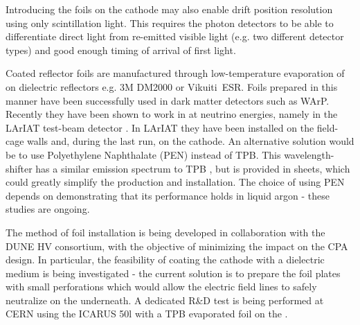 Introducing the foils on the cathode may also enable drift position resolution using only scintillation light. This requires the photon detectors to be able to differentiate direct  light from re-emitted visible light (e.g. two different  detector types) and good enough timing of arrival of first light.

Coated reflector foils are manufactured through low-temperature evaporation of  on dielectric reflectors e.g. 3M DM2000 or Vikuiti\texttrademark\  ESR. Foils prepared in this manner have been successfully used in dark matter detectors such as WArP\cite{Acciarri:2008kv}. Recently they have been shown to work in  at neutrino energies, namely  in the LArIAT test-beam detector \cite{Garcia-Gamez:2017cmu}. In LArIAT they have been installed on the field-cage walls and, during the last run, on the cathode. An alternative solution would be to use Polyethylene Naphthalate (PEN) instead of TPB. This wavelength-shifter has a similar emission spectrum to TPB \cite{Kuzniak:2018dcf}, but is provided in sheets, which could greatly simplify the production and installation. The choice of using PEN depends on demonstrating that its performance holds in liquid argon - these studies are ongoing. 


The method of foil installation is being developed in collaboration with the DUNE HV consortium, with the objective of minimizing the impact on the CPA design. 
In particular, the feasibility of coating the cathode with a dielectric medium is being investigated - the current solution is to prepare the foil plates with small perforations which would allow the electric field
lines to safely neutralize on the  underneath. A dedicated R\&D test is being performed at CERN using the ICARUS 50l with a TPB evaporated foil on the . 



